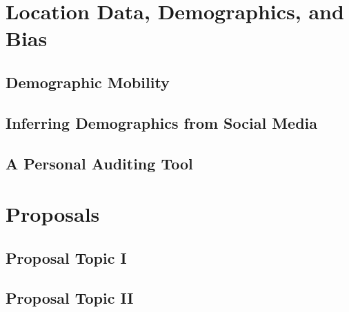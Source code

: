 \documentclass[12pt]{report}
\begin{document}
\chapter{Location Data, Demographics, and Bias}
\section{Demographic Mobility}
\label{sec:bias}



\section{Inferring Demographics from Social Media}
\label{sec:demo}



\section{A Personal Auditing Tool}
\label{sec:findyou}


\chapter{Proposals}

\section{Proposal Topic I}
\label{sec:proposal-i}



\section{Proposal Topic II}
\label{sec:proposal-ii}



% 


\pagebreak

\begin{footnotesize}

% 

\end{footnotesize}
\end{document}
